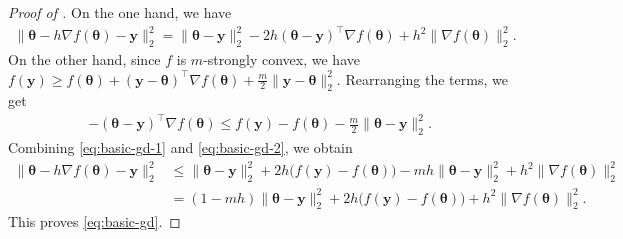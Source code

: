 \documentclass[aos,reqno]{imsart}
\newcommand\by{\boldsymbol y}
\newcommand\btheta{\boldsymbol\theta}
\theoremstyle{definition}
\begin{document}
\begin{proof}[Proof of ]
    On the one hand, we have
    \begin{align}
        \|\btheta-h\nabla f(\btheta)-\by\|_2^2 
        = \|\btheta-\by\|_2^2
        -2h(\btheta-\by)^\top \nabla f(\btheta)
        + h^2\|\nabla f(\btheta)\|_2^2.
        \label{eq:basic-gd-1}
    \end{align}
    On the other hand, since $f$ is $m$-strongly 
    convex, we have $f(\by)\geqslant f(\btheta)
    + (\by-\btheta)^\top \nabla f(\btheta)
    + \frac{m}{2}\|\by-\btheta\|_2^2$. Rearranging
    the terms, we get
    \begin{align}
        -(\btheta-\by)^\top \nabla f(\btheta)
        \leqslant
        f(\by)-f(\btheta)
        - \frac{m}{2}\|\btheta-\by\|_2^2.
        \label{eq:basic-gd-2}
    \end{align}
    Combining \eqref{eq:basic-gd-1} and \eqref{eq:basic-gd-2}, we obtain
    \begin{align}
        \|\btheta-h\nabla f(\btheta)-\by\|_2^2
        &\leqslant
        \|\btheta-\by\|_2^2
        + 2h\big(f(\by)-f(\btheta)\big)
        - mh\|\btheta-\by\|_2^2
        + h^2\|\nabla f(\btheta)\|_2^2 \\
        &= (1-mh)\|\btheta-\by\|_2^2
        + 2h\big(f(\by)-f(\btheta)\big)
        + h^2\|\nabla f(\btheta)\|_2^2.
    \end{align}
    This proves \eqref{eq:basic-gd}.
\end{proof}
\end{document}
